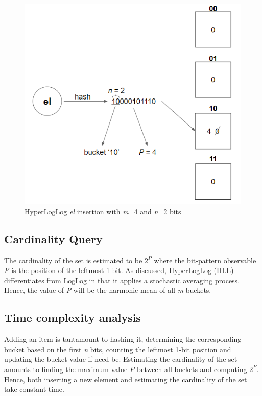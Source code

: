 \begin{figure}[!htb]
    \begin{center}
      \includegraphics[scale=0.8]{figures/hll-insertion.png}
      \caption[HyperLogLog insertion]{HyperLogLog \textit{el} insertion with \textit{m}=4 and \textit{n}=2 bits}
      \label{fig:hll-insert}
    \end{center}
\end{figure}

\subsection*{Cardinality Query}
The cardinality of the set is estimated to be $2^\textit{P}$ where the bit-pattern observable \textit{P} is the position of the leftmost 1-bit. As discussed, HyperLogLog (HLL) differentiates from LogLog in that it applies a stochastic averaging process. Hence, the value of \textit{P} will be the harmonic mean of all \textit{m} buckets.


\subsection*{Time complexity analysis}
Adding an item is tantamount to hashing it, determining the corresponding bucket based on the first \textit{n} bits, counting the leftmost 1-bit position and updating the bucket value if need be. Estimating the cardinality of the set amounts to finding the maximum value \textit{P} between all buckets and computing $2^P$. Hence, both inserting a new element and estimating the cardinality of the set take constant time.


